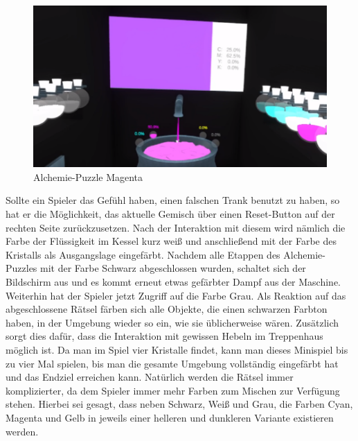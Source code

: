 \begin{figure}[h]
	\centering
	\includegraphics[width=\textwidth/2]{Pictures/Alchemie_Magenta}
	\caption{Alchemie-Puzzle Magenta}
	\label{fig:alchemie_magenta}
\end{figure}\newpage \noindent
Sollte ein Spieler das Gefühl haben, einen falschen Trank benutzt zu haben, so hat er die Möglichkeit, das aktuelle Gemisch über einen Reset-Button auf der rechten Seite zurückzusetzen. Nach der Interaktion mit diesem wird nämlich die Farbe der Flüssigkeit im Kessel kurz weiß und anschließend mit der Farbe des Kristalls als Ausgangslage eingefärbt. Nachdem alle Etappen des Alchemie-Puzzles mit der Farbe Schwarz abgeschlossen wurden, schaltet sich der Bildschirm aus und es kommt erneut etwas gefärbter Dampf aus der Maschine. Weiterhin hat der Spieler jetzt Zugriff auf die Farbe Grau. Als Reaktion auf das abgeschlossene Rätsel färben sich alle Objekte, die einen schwarzen Farbton haben, in der Umgebung wieder so ein, wie sie üblicherweise wären. Zusätzlich sorgt dies dafür, dass die Interaktion mit gewissen Hebeln im Treppenhaus möglich ist. Da man im Spiel vier Kristalle findet, kann man dieses Minispiel bis zu vier Mal spielen, bis man die gesamte Umgebung vollständig eingefärbt hat und das Endziel erreichen kann. Natürlich werden die Rätsel immer komplizierter, da dem Spieler immer mehr Farben zum Mischen zur Verfügung stehen. Hierbei sei gesagt, dass neben Schwarz, Weiß und Grau, die Farben Cyan, Magenta und Gelb in jeweils einer helleren und dunkleren Variante existieren werden.
